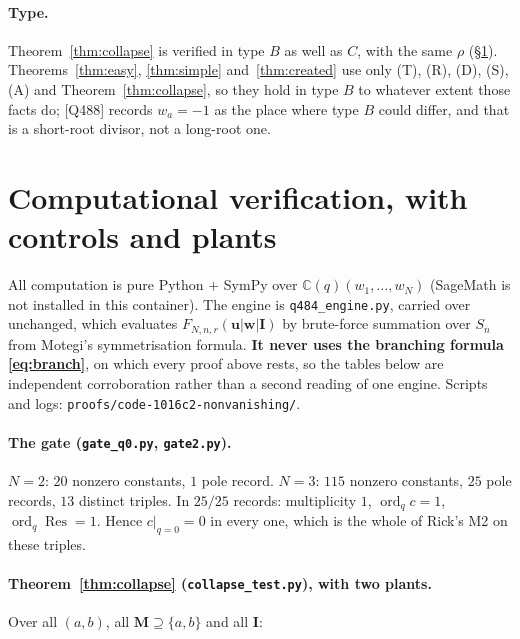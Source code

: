 \documentclass[11pt]{article}
\theoremstyle{plain}
\theoremstyle{definition}
\theoremstyle{remark}
\theoremstyle{plain}
\newcommand{\bI}{\mathbf{I}}
\newcommand{\bM}{\mathbf{M}}
\newcommand{\bu}{\mathbf{u}}
\newcommand{\bw}{\mathbf{w}}
\newcommand{\ord}{\operatorname{ord}}
\newcommand{\Res}{\operatorname{Res}}
\begin{document}
\paragraph{Type.}
Theorem~\ref{thm:collapse} is verified in type $B$ as well as $C$, with the
same $\rho$ (\S\ref{sec:verif}).  Theorems~\ref{thm:easy},
\ref{thm:simple} and~\ref{thm:created} use only (T), (R), (D), (S), (A) and
Theorem~\ref{thm:collapse}, so they hold in type $B$ to whatever extent those
facts do; [Q488] records $w_a=-1$ as the place where type $B$ could differ, and
that is a short-root divisor, not a long-root one.

\section{Computational verification, with controls and plants}
\label{sec:verif}

All computation is pure Python $+$ SymPy over
$\mathbb{C}(q)(w_1,\dots,w_N)$ (SageMath is not installed in this container).
The engine is \texttt{q484\_engine.py}, carried over unchanged, which evaluates
$F_{N,n,r}(\bu|\bw|\bI)$ by brute-force summation over $S_n$ from Motegi's
symmetrisation formula.  \textbf{It never uses the branching formula
\eqref{eq:branch}}, on which every proof above rests, so the tables below are
independent corroboration rather than a second reading of one engine.
Scripts and logs: \texttt{proofs/code-1016c2-nonvanishing/}.

\paragraph{The gate (\texttt{gate\_q0.py}, \texttt{gate2.py}).}
$N=2$: $20$ nonzero constants, $1$ pole record.  $N=3$: $115$ nonzero
constants, $25$ pole records, $13$ distinct triples.  In $25/25$ records:
multiplicity $1$, $\ord_qc=1$, $\ord_q\Res=1$.  Hence $c|_{q=0}=0$ in every
one, which is the whole of Rick's M2 on these triples.

\paragraph{Theorem~\ref{thm:collapse} (\texttt{collapse\_test.py}), with two
plants.}
Over all $(a,b)$, all $\bM\supseteq\{a,b\}$ and all $\bI$:
\end{document}
